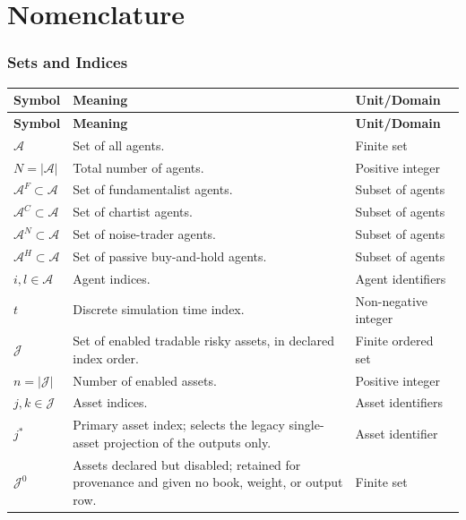 \documentclass[12pt, a4paper]{article}
\begin{document}
    \section*{Nomenclature}

    \subsubsection*{Sets and Indices}

    \begin{longtable}{@{}L{0.22\textwidth}L{0.50\textwidth}L{0.20\textwidth}@{}}
        \toprule
        \textbf{Symbol} & \textbf{Meaning} & \textbf{Unit/Domain} \\
        \midrule
        \endfirsthead
        \toprule
        \textbf{Symbol} & \textbf{Meaning} & \textbf{Unit/Domain} \\
        \midrule
        \endhead
        \(\mathcal{A}\) & Set of all agents. & Finite set \\
        \(N=|\mathcal{A}|\) & Total number of agents. & Positive integer \\
        \(\mathcal{A}^F\subset\mathcal{A}\) & Set of fundamentalist agents. & Subset of agents \\
        \(\mathcal{A}^C\subset\mathcal{A}\) & Set of chartist agents. & Subset of agents \\
        \(\mathcal{A}^N\subset\mathcal{A}\) & Set of noise-trader agents. & Subset of agents \\
        \(\mathcal{A}^H\subset\mathcal{A}\) & Set of passive buy-and-hold agents. & Subset of agents \\
        \(i,l\in\mathcal{A}\) & Agent indices. & Agent identifiers \\
        \(t\) & Discrete simulation time index. & Non-negative integer \\
        \(\mathcal{J}\) & Set of enabled tradable risky assets, in declared index order. & Finite ordered set \\
        \(n=|\mathcal{J}|\) & Number of enabled assets. & Positive integer \\
        \(j,k\in\mathcal{J}\) & Asset indices. & Asset identifiers \\
        \(j^{\ast}\) & Primary asset index; selects the legacy single-asset projection of the outputs only. & Asset identifier \\
        \(\mathcal{J}^{0}\) & Assets declared but disabled; retained for provenance and given no book, weight, or output row. & Finite set \\
        \bottomrule
    \end{longtable}
\end{document}
